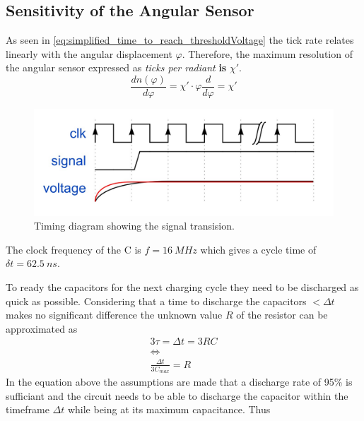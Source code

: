     \subsection*{Sensitivity of the Angular Sensor}\label{sec:preparation_task_8}
        As seen in \cref{eq:simplified_time_to_reach_thresholdVoltage} the tick rate relates linearly with the angular displacement \( \varphi \).
        Therefore, the maximum resolution of the angular sensor expressed as \textit{ticks per radiant} \textbf{is} \( \chi' \).
        \begin{equation}
            \frac{dn(\varphi)}{d\varphi} = \chi' \cdot \varphi \frac{d}{d\varphi} = \chi'
        \end{equation}
        \begin{figure}
            \centering
            \includegraphics[width=.7\textwidth]{aufbau/clk_signal_timing_diagram.jpg}
            \caption[Timing diagram showing the signal transision]{Timing diagram showing the signal transision.}
            \label{fig:timing_diagram}
        \end{figure}
        The clock frequency of the \micro C is \( f = \SI[]{16}[]{MHz} \) which gives a cycle time of \( \delta t = \SI[]{62.5}[]{ns} \).\par
        To ready the capacitors for the next charging cycle they need to be discharged as quick as possible. Considering
        that a time to discharge the capacitors \( < \Delta t \) makes no significant difference the unknown value \( R \)
        of the resistor can be approximated as
        \begin{gather}
            3\tau = \Delta t = 3RC \nonumber \\
            \Leftrightarrow \nonumber \\
            \frac{\Delta t}{3C_{max}} = R
            \label{eq:resistor_approximation}
        \end{gather}
        In the equation above the assumptions are made that a discharge rate of 95\% is sufficiant and the circuit needs
        to be able to discharge the capacitor within the timeframe \( \Delta t \) while being at its maximum capacitance.
        Thus
